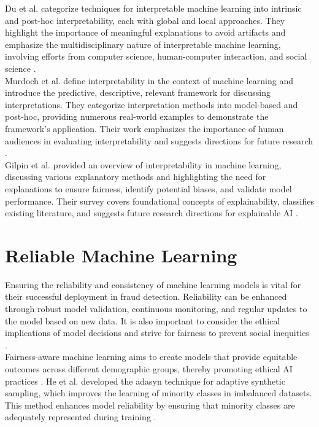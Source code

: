 \documentclass[12pt,a4paper]{report}
\begin{document}
Du et al. categorize techniques for interpretable machine learning into intrinsic and post-hoc interpretability, each with global and local approaches. They highlight the importance of meaningful explanations to avoid artifacts and emphasize the multidisciplinary nature of interpretable machine learning, involving efforts from computer science, human-computer interaction, and social science \citep[p.68]{du2019techniques}.\\

Murdoch et al. define interpretability in the context of machine learning and introduce the predictive, descriptive, relevant framework for discussing interpretations. They categorize interpretation methods into model-based and post-hoc, providing numerous real-world examples to demonstrate the framework's application. Their work emphasizes the importance of human audiences in evaluating interpretability and suggests directions for future research \citep[p. 22071]{murdoch2019definitions}.\\

Gilpin et al. provided an overview of interpretability in machine learning, discussing various explanatory methods and highlighting the need for explanations to ensure fairness, identify potential biases, and validate model performance. Their survey covers foundational concepts of explainability, classifies existing literature, and suggests future research directions for explainable AI \citep[p. 80]{gilpin2018explaining}.

\section{Reliable Machine Learning}
Ensuring the reliability and consistency of machine learning models is vital for their successful deployment in fraud detection. Reliability can be enhanced through robust model validation, continuous monitoring, and regular updates to the model based on new data. It is also important to consider the ethical implications of model decisions and strive for fairness to prevent social inequities \citep[p.12]{mehrabi2021survey}.\\

Fairness-aware machine learning aims to create models that provide equitable outcomes across different demographic groups, thereby promoting ethical AI practices \citep[p.1]{corbett2023measure}. He et al. developed the \acrshort{adasyn} technique for adaptive synthetic sampling, which improves the learning of minority classes in imbalanced datasets. This method enhances model reliability by ensuring that minority classes are adequately represented during training \citep[p.1325]{he2008adasyn}.\\
\end{document}
